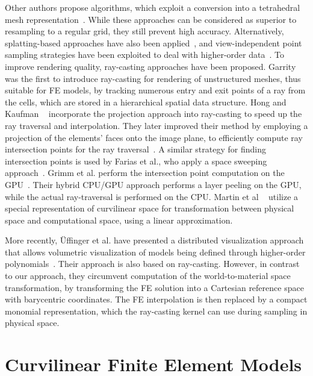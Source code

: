 \documentclass[review,journal]{vgtc}         %
\begin{document}
Other authors propose algorithms, which exploit a conversion into a tetrahedral mesh representation~\cite{Reed95IncrementalSlicing, marmitt05femtess,schroeder06femtess, Georgii06ageneric}. While these approaches can be considered as superior to resampling to a regular grid, they still prevent high accuracy. Alternatively, splatting-based approaches have also been applied~\cite{mao95femsplatting}, and view-independent point sampling strategies have been exploited to deal with higher-order data~\cite{zhou06pointbased}. To improve rendering quality, ray-casting approaches have been proposed. Garrity ~\cite{garrity90RaytracingIrregular} was the first to introduce ray-casting for rendering of unstructured meshes, thus suitable for FE models, by tracking numerous entry and exit points of a ray from the cells, which are stored in a hierarchical spatial data structure. Hong and Kaufman ~\cite{hong98curvilinear} incorporate the projection approach into ray-casting to speed up the ray traversal and interpolation. They later improved their method by employing a projection of the elements' faces onto the image plane, to efficiently compute ray intersection points for the ray traversal~\cite{hong99curvilinear}. A similar strategy for finding intersection points is used by Farias et al., who apply a space sweeping approach~\cite{farias00zsweep}. Grimm et al. perform the intersection point computation on the GPU~\cite{grimm04curvilinear}. Their hybrid CPU/GPU approach performs a layer peeling on the GPU, while the actual ray-traversal is performed on the CPU. Martin et al ~\cite{MartinCurvilinearPacificVIS08} utilize a special representation of curvilinear space for transformation between physical space and computational space, using a linear approximation. 

More recently, {\"U}ffinger et al. have presented a distributed visualization approach that allows volumetric visualization of models being defined through higher-order polynomials~\cite{uffinger10femraycasting}. Their approach is also based on ray-casting. However, in contrast to our approach, they circumvent computation of the world-to-material space transformation, by transforming the FE solution into a Cartesian reference space with barycentric coordinates. The FE interpolation is then replaced by a compact monomial representation, which the ray-casting kernel can use during sampling in physical space.

\section{Curvilinear Finite Element Models}\label{sec:theory}
\end{document}
